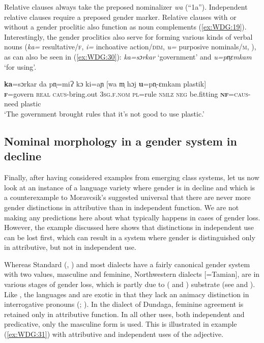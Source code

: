 \documentclass[output=collectionpaper]{langsci/langscibook}
\begin{document}
Relative clauses always take the preposed nominalizer \textit{wa} (``1a''). Independent relative clauses require a preposed gender marker. Relative clauses with or without a gender proclitic also function as noun complements (\ref{ex:WDG:19}). Interestingly, the gender proclitics also serve for forming various kinds of verbal nouns (\textit{ka=} resultative/\textsc{f}, \textit{i=} inchoative action/\textsc{dim}, \textit{u=} purposive nominals/\textsc{m}, \citealt[71]{Ring2015}), as can also be seen in (\ref{ex:WDG:30}): \textit{ka=sɔrkar} `government' and \textit{u=pn̩ɛmkam} `for using'.

\ea
\label{ex:WDG:30}
\gll \textbf{ka}=sɔrkar	da	pn̩=miɁ	kɔ	ki=aɲ	[wa	m̩	hɔj	\textbf{u}=pn̩-ɛmkam	plastik]\\
\textbf{\textsc{f}}=govern	\textsc{real}	\textsc{caus}-bring.out	3\textsc{sg.f.nom}	\textsc{pl}=rule \textsc{nmlz}	\textsc{neg}	be.fitting	\textbf{\textsc{nf}}=\textsc{caus}-need	plastic\\
\glt	`The government brought rules that it's not good to use plastic.'\\
\z


  \subsection{Nominal morphology in a gender system in decline}
  \label{sec:WDG:4.4}

Finally, after having considered examples from emerging class systems, let us now look at an instance of a language variety where gender is in decline and which is a counterexample to Moravcsik's suggested universal that there are never more gender distinctions in attributive than in independent function. We are not making any predictions here about what typically happens in cases of gender loss. However, the example discussed here shows that distinctions in independent use can be lost first, which can result in a system where gender is distinguished only in attributive, but not in independent use.

Whereas Standard  (, ) and most  dialects have a fairly canonical gender system with two values, masculine and feminine, Northwestern  dialects [=Tamian], are in various stages of gender loss, which is partly due to  ( and ) substrate (see \citealt{Waelchli2017} and ). Like , the  languages  and  are exotic in that they lack an animacy distinction in interrogative pronouns (\citealt{Nau1999}; \citealt{Lindstrom1995}). In the dialect of Dundaga, feminine agreement is retained only in attributive function. In all other uses, both independent and predicative, only the masculine form is used. This is illustrated in example (\ref{ex:WDG:31}) with attributive and independent uses of the adjective.
\end{document}

